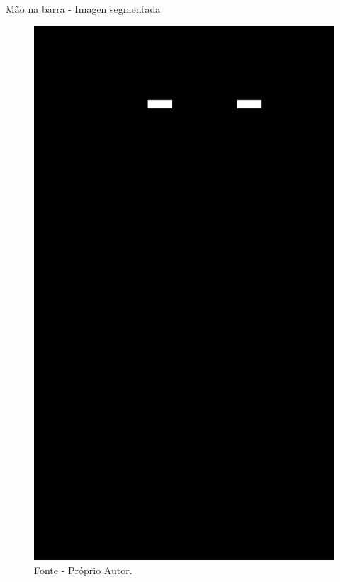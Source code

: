 \begin{frame}{Mão na barra - Imagen segmentada}
    \begin{figure}[!ht]
    \centering
    \includegraphics[scale=0.1]{img/desenvolvimento/maoBarra/only_hands.png}
    \caption*{Fonte - Próprio Autor.}
    \end{figure}
\end{frame}



